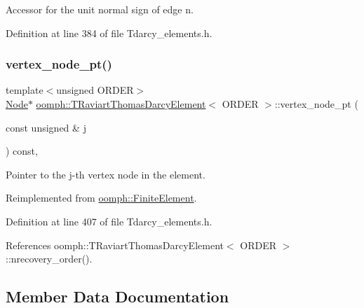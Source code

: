 Accessor for the unit normal sign of edge n. 



Definition at line 384 of file Tdarcy\+\_\+elements.\+h.

\mbox{\label{classoomph_1_1TRaviartThomasDarcyElement_a825931f56d8b570bc515808dee107353}} 
\subsubsection{\texorpdfstring{vertex\+\_\+node\+\_\+pt()}{vertex\_node\_pt()}}
{\footnotesize\ttfamily template$<$unsigned O\+R\+D\+ER$>$ \\
\hyperlink{classoomph_1_1Node}{Node}$\ast$ \hyperlink{classoomph_1_1TRaviartThomasDarcyElement}{oomph\+::\+T\+Raviart\+Thomas\+Darcy\+Element}$<$ O\+R\+D\+ER $>$\+::vertex\+\_\+node\+\_\+pt (\begin{DoxyParamCaption}\item[{const unsigned \&}]{j }\end{DoxyParamCaption}) const\hspace{0.3cm}{\ttfamily [inline]}, {\ttfamily [virtual]}}



Pointer to the j-\/th vertex node in the element. 



Reimplemented from \hyperlink{classoomph_1_1FiniteElement_a863c4382c879a77ad5607c6f9781c761}{oomph\+::\+Finite\+Element}.



Definition at line 407 of file Tdarcy\+\_\+elements.\+h.



References oomph\+::\+T\+Raviart\+Thomas\+Darcy\+Element$<$ O\+R\+D\+E\+R $>$\+::nrecovery\+\_\+order().



\subsection{Member Data Documentation}
\mbox{\label{classoomph_1_1TRaviartThomasDarcyElement_a89a31c8a5261b1bca700707147d8a143}} 
